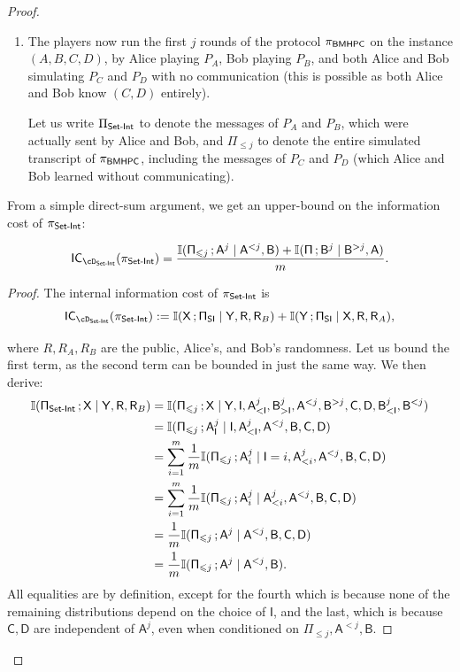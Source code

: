 \documentclass[11pt,letterpaper]{article}
\renewcommand{\leq}{\leqslant}
\renewcommand{\le}{\leq}
\theoremstyle{definition}
\newenvironment{abox}{\begin{tcolorbox}[
		enlarge top by=5pt,
		enlarge bottom by=5pt,
		breakable,
		frame hidden,
		overlay broken = {
			\draw[line width=1pt, black]
			(frame.north west) rectangle (frame.south east);},
		overlay = {
			\draw[line width=1pt, black]
			(frame.north west) rectangle (frame.south east);},
		boxsep=0pt,
		left=4pt,
		right=4pt,
		top=10pt,
		arc=0pt,
		boxrule=1pt,toprule=1pt,
		colback=white
	]}
{\end{tcolorbox}}
\newcommand{\dsi}{\cD_\SI}
\newcommand{\rPi}{\rv{\Pi}}
\newcommand{\bmhpc}{\ensuremath{\textnormal{\textsf{BMHPC}}}\xspace}
\newcommand{\Prot}{\ensuremath{\Pi}}
\newcommand{\prot}{\ensuremath{\pi}}
\newcommand{\rA}{\rv{A}}
\newcommand{\rB}{\rv{B}}
\newcommand{\rC}{\rv{C}}
\newcommand{\rD}{\rv{D}}
\newcommand{\rX}{\rv{X}}
\newcommand{\rY}{\rv{Y}}
\newcommand{\rI}{\rv{I}}
\newcommand{\rv}[1]{\ensuremath{\mathsf{#1}}}
\newcommand{\II}{\ensuremath{\mathbb{I}}}
\newcommand{\mi}[2]{\ensuremath{\II(#1 \,; #2)}}
\newcommand{\rProtSI}{\ensuremath{\rv{\Prot}}_{\ensuremath{\textnormal{\textsf{SI}}}}\xspace}
\newcommand{\SI}{\ensuremath{\textnormal{\textsf{Set-Int}}}\xspace}
\newcommand{\rR}{\rv{R}}
\newcommand{\ICost}[2]{\ensuremath{\textnormal{\textsf{IC}}_{#2}(#1)}\xspace}
\newcommand{\IC}[2]{\ICost{#1}{#2}}
\begin{document}
\begin{proof}
\begin{abox}
\begin{enumerate}
        
	\item The players now run the first $j$ rounds of the protocol $\prot_\bmhpc$ on the instance $(A,B,C,D)$, by Alice playing $P_A$, Bob playing $P_B$, and both Alice and Bob simulating $P_C$ and $P_D$ with no communication (this is possible as both Alice and Bob know $(C, D)$ entirely). 
 
    Let us write $\Pi_\SI$ to denote the messages of $P_A$ and $P_B$, which were actually sent by Alice and Bob, and $\Pi_{\le j}$ to denote the entire simulated transcript of $\prot_\bmhpc$, including the messages of $P_C$ and $P_D$ (which Alice and Bob learned without communicating).
    \end{enumerate}
\end{abox}

From a simple direct-sum argument, we get an upper-bound on the information cost of $\pi_\SI$:

\begin{claim} \label{clm:direct-sum}
    \[ \ICost{\pi_\SI}{\dsi} = \frac{\mi{\rPi_{\le j}}{\rA^j \mid \rA^{< j}, \rB}
    + \mi{\rPi}{\rB^j \mid \rB^{> j}, \rA}}{m}. \]
\end{claim}

\begin{proof}
    The internal information cost of $\prot_\SI$ is
    \[
      \IC{\prot_\SI}{\cD_\SI}
      := \mi{\rX}{\rProtSI \mid \rY, \rR, \rR_B}
      + \mi{\rY}{\rProtSI \mid \rX, \rR, \rR_A},
    \]

    where $R, R_A, R_B$ are the public, Alice's, and Bob's randomness.
    Let us bound the first term, as the second term can be bounded in just the
    same way.
    We then derive:   
\begin{align*}
	\mi{\rPi_\SI}{\rX \mid \rY, \rR, \rR_B} %
    & = \mi{\rPi_{\le j}}{\rX \mid \rY, \rI,\rA^j_{<\rI},\rB^j_{>\rI},\rA^{< j},\rB^{> j},\rC,\rD, \rB^j_{< \rI}, \rB^{< j}}\\
    & = \mi{\rPi_{\le j}}{\rA^j_\rI \mid \rI,\rA^j_{<\rI},\rA^{< j},\rB,\rC,\rD}\\
    & =  \sum_{i=1}^m \frac{1}{m} \mi{\rPi_{\le j}}{\rA^j_i \mid \rI=i,\rA^j_{<i},\rA^{< j},\rB,\rC,\rD}\\
    & =  \sum_{i=1}^m \frac{1}{m} \mi{\rPi_{\le j}}{\rA^j_i \mid \rA^j_{<i},\rA^{< j},\rB,\rC,\rD}\\
    & =  \frac{1}{m} \mi{\rPi_{\le j}}{\rA^j \mid \rA^{< j},\rB,\rC,\rD}\\
    & =  \frac{1}{m} \mi{\rPi_{\le j}}{\rA^j \mid \rA^{< j},\rB}. 
\end{align*}
All equalities are by definition, except for the fourth which is because none of
the remaining distributions depend on the choice of $\rI$, and the last, which
is because $\rC, \rD$ are independent of $\rA^j$, even when conditioned on
$\rPi_{\le j}, \rA^{<j}, \rB$.
\end{proof}


\end{proof}
\end{document}
